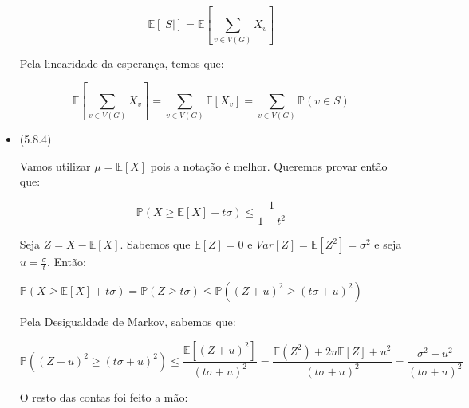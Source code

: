 \documentclass{article}
\begin{document}
\begin{itemize}
	      \[\mathbb{E}[|S|] = \mathbb{E}[\sum_{v \in V(G)} X_v]\]

	      Pela linearidade da esperança, temos que:

	      \[\mathbb{E}[\sum_{v \in V(G)} X_v] = \sum_{v \in V(G)} \mathbb{E}[X_v] = \sum_{v \in V(G)} \mathbb{P}(v \in S)\]

	\item (5.8.4)

	      Vamos utilizar \(\mu = \mathbb{E}[X]\) pois a notação é melhor. Queremos provar então que:

	      \[\mathbb{P}(X \geq \mathbb{E}[X] + t \sigma) \leq \frac{1}{1 + t^2}\]

	      Seja \(Z = X - \mathbb{E}[X]\). Sabemos que \(\mathbb{E}[Z] = 0\) e \(Var[Z] = \mathbb{E}[Z^2] = \sigma^2\)
	      e seja \(u = \frac{\sigma}{t}\). Então:

	      \(\mathbb{P}(X \geq \mathbb{E}[X] + t \sigma) = \mathbb{P}(Z \geq t \sigma) \leq \mathbb{P}((Z + u)^2 \geq (t \sigma + u)^2)\)

	      Pela Desigualdade de Markov, sabemos que:

	      \[\mathbb{P}((Z + u)^2 \geq (t \sigma + u)^2) \leq \frac{\mathbb{E}[(Z + u)^2]}{(t \sigma+ u)^2} = \frac{\mathbb{E}(Z^2) + 2u\mathbb{E}[Z] + u^2}{(t\sigma + u)^2} = \frac{\sigma^2 + u^2}{(t \sigma + u)^2}\]

	      O resto das contas foi feito a mão:


\end{itemize}
\end{document}

